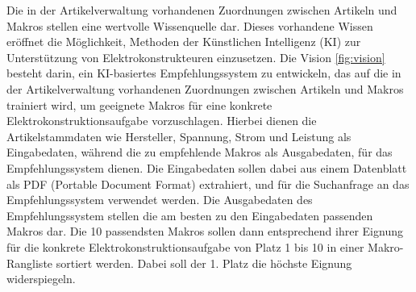 Die in der Artikelverwaltung vorhandenen Zuordnungen zwischen Artikeln und Makros stellen eine wertvolle Wissenquelle dar. 
Dieses vorhandene Wissen eröffnet die Möglichkeit, Methoden der Künstlichen Intelligenz (KI) zur Unterstützung von Elektrokonstrukteuren einzusetzen.
Die Vision \ref{fig:vision} besteht darin, ein KI-basiertes Empfehlungssystem zu entwickeln, das auf die in der Artikelverwaltung vorhandenen Zuordnungen zwischen Artikeln und Makros trainiert wird, 
um geeignete Makros für eine konkrete Elektrokonstruktionsaufgabe vorzuschlagen.
Hierbei dienen die Artikelstammdaten wie Hersteller, Spannung, Strom und Leistung als Eingabedaten,
während die zu empfehlende Makros als Ausgabedaten, für das Empfehlungssystem dienen. 
Die Eingabedaten sollen dabei aus einem Datenblatt als PDF (Portable Document Format) extrahiert, und für die Suchanfrage an das Empfehlungssystem verwendet werden.
Die Ausgabedaten des Empfehlungssystem stellen die am besten zu den Eingabedaten passenden Makros dar. 
Die 10 passendsten Makros sollen dann entsprechend ihrer Eignung für die konkrete Elektrokonstruktionsaufgabe von Platz 1 bis 10 in einer Makro-Rangliste sortiert werden.
Dabei soll der 1. Platz die höchste Eignung widerspiegeln.

